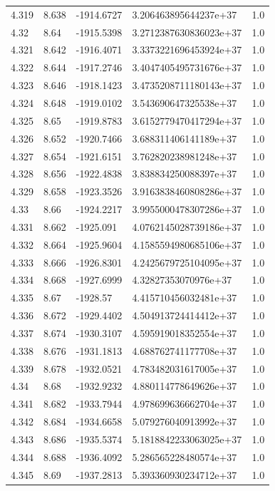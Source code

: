 \begin{tabular}{lllll}
4.319 & 8.638 & -1914.6727 & 3.206463895644237e+37 & 1.0 \\
4.32 & 8.64 & -1915.5398 & 3.2712387630836023e+37 & 1.0 \\
4.321 & 8.642 & -1916.4071 & 3.3373221696453924e+37 & 1.0 \\
4.322 & 8.644 & -1917.2746 & 3.4047405495731676e+37 & 1.0 \\
4.323 & 8.646 & -1918.1423 & 3.4735208711180143e+37 & 1.0 \\
4.324 & 8.648 & -1919.0102 & 3.543690647325538e+37 & 1.0 \\
4.325 & 8.65 & -1919.8783 & 3.6152779470417294e+37 & 1.0 \\
4.326 & 8.652 & -1920.7466 & 3.688311406141189e+37 & 1.0 \\
4.327 & 8.654 & -1921.6151 & 3.762820238981248e+37 & 1.0 \\
4.328 & 8.656 & -1922.4838 & 3.838834250088397e+37 & 1.0 \\
4.329 & 8.658 & -1923.3526 & 3.9163838460808286e+37 & 1.0 \\
4.33 & 8.66 & -1924.2217 & 3.9955000478307286e+37 & 1.0 \\
4.331 & 8.662 & -1925.091 & 4.0762145028739186e+37 & 1.0 \\
4.332 & 8.664 & -1925.9604 & 4.1585594980685106e+37 & 1.0 \\
4.333 & 8.666 & -1926.8301 & 4.2425679725104095e+37 & 1.0 \\
4.334 & 8.668 & -1927.6999 & 4.32827353070976e+37 & 1.0 \\
4.335 & 8.67 & -1928.57 & 4.415710456032481e+37 & 1.0 \\
4.336 & 8.672 & -1929.4402 & 4.504913724414412e+37 & 1.0 \\
4.337 & 8.674 & -1930.3107 & 4.595919018352554e+37 & 1.0 \\
4.338 & 8.676 & -1931.1813 & 4.688762741177708e+37 & 1.0 \\
4.339 & 8.678 & -1932.0521 & 4.783482031617005e+37 & 1.0 \\
4.34 & 8.68 & -1932.9232 & 4.880114778649626e+37 & 1.0 \\
4.341 & 8.682 & -1933.7944 & 4.978699636662704e+37 & 1.0 \\
4.342 & 8.684 & -1934.6658 & 5.079276040913992e+37 & 1.0 \\
4.343 & 8.686 & -1935.5374 & 5.1818842233063025e+37 & 1.0 \\
4.344 & 8.688 & -1936.4092 & 5.286565228480574e+37 & 1.0 \\
4.345 & 8.69 & -1937.2813 & 5.393360930234712e+37 & 1.0 \\

\end{tabular}
